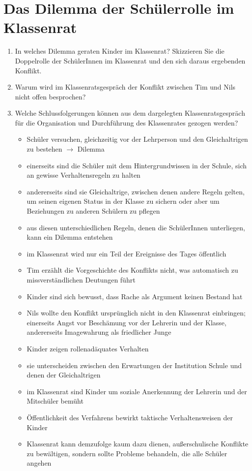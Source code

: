 {\newpage

\section{Das Dilemma der Schülerrolle im Klassenrat} {\cite{DB08}

\begin{enumerate}
	\item{
		In welches Dilemma geraten Kinder im Klassenrat?
		Skizzieren Sie die Doppelrolle der SchülerInnen im Klassenrat und den sich daraus ergebenden Konflikt.
	}
	\item{Warum wird im Klassenratsgespräch der Konflikt zwischen Tim und Nils nicht \glqq offen\grqq{} besprochen?}
	\item{
		Welche Schlussfolgerungen können aus dem dargelegten Klassenratsgespräch für die Organisation und Durchführung des Klassenrates gezogen werden?
		\begin{itemize}
			\item{Schüler versuchen, gleichzeitig vor der Lehrperson und den Gleichaltrigen zu bestehen $\rightarrow$ Dilemma}
			\item{einerseits sind die Schüler mit dem Hintergrundwissen in der Schule, sich an gewisse Verhaltensregeln zu halten}
			\item{andererseits sind sie Gleichaltrige, zwischen denen andere Regeln gelten, um seinen eigenen Status in der Klasse zu sichern oder aber um Beziehungen zu anderen Schülern zu pflegen}
			\item{aus diesen unterschiedlichen Regeln, denen die SchülerInnen unterliegen, kann ein Dilemma entstehen}
			\item{im Klassenrat wird nur ein Teil der Ereignisse des Tages öffentlich}
			\item{Tim erzählt die Vorgeschichte des Konflikts nicht, was automatisch zu missverständlichen Deutungen führt}
			\item{Kinder sind sich bewusst, dass Rache als Argument keinen Bestand hat}
			\item{Nils wollte den Konflikt ursprünglich nicht in den Klassenrat einbringen; einerseits Angst vor Beschämung vor der Lehrerin und der Klasse, andererseits Imagewahrung als friedlicher Junge}
			\item{Kinder zeigen rollenadäquates Verhalten}
			\item{sie unterscheiden zwischen den Erwartungen der Institution Schule und denen der Gleichaltrigen}
			\item{im Klassenrat sind Kinder um soziale Anerkennung der Lehrerin und der Mitschüler bemüht}
			\item{Öffentlichkeit des Verfahrens bewirkt taktische Verhaltensweisen der Kinder}
			\item{Klassenrat kann demzufolge kaum dazu dienen, außerschulische Konflikte zu bewältigen, sondern sollte Probleme behandeln, die alle Schüler angehen}
		\end{itemize}
	}
\end{enumerate}

}}
